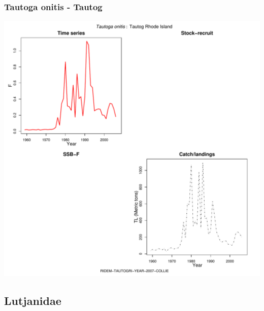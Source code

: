 \subsubsection{Tautoga onitis - Tautog}
\begin{center}
\includegraphics[width=1.2\textwidth]{../R/figures/RIDEM-TAUTOGRI-YEAR-2007-COLLIE.pdf}
\end{center}

\subsection{Lutjanidae}

